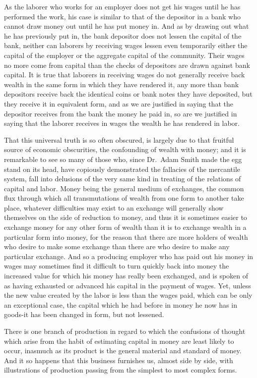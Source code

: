 As the laborer who works for an employer does not get his wages until he
has performed the work, his case is similar to that of the depositor in
a bank who cannot draw money out until he has put money in. And as by
drawing out what he has previously put in, the bank depositor does not
lessen the capital of the bank, neither can laborers by receiving wages
lessen even temporarily either the capital of the employer or the
aggregate capital of the community. Their wages no more come from
capital than the checks of depositors are drawn against bank capital. It
is true that laborers in receiving wages do not generally receive back
wealth in the same form in which they have rendered it, any more than
bank depositors receive back the identical coins or bank notes they have
deposited, but they receive it in equivalent form, and as we are
justified in saying that the depositor receives from the bank the money
he paid in, so are we justified in saying that the laborer receives in
wages the wealth he has rendered in labor.

That this universal truth is so often obscured, is largely due to that
fruitful source of economic obscurities, the confounding of wealth with
money; and it is remarkable to see so many of those who, since Dr.~Adam
Smith made the egg stand on its head, have copiously demonstrated the
fallacies of the mercantile system, fall into delusions of the very same
kind in treating of the relations of capital and labor. Money being the
general medium of exchanges, the common flux through which all
transmutations of wealth from one form to another take place, whatever
difficulties may exist to an exchange will generally show themselves on
the side of reduction to money, and thus it is sometimes easier to
exchange money for any other form of wealth than it is to exchange
wealth in a particular form into money, for the reason that there are
more holders of wealth who desire to make some exchange than there are
who desire to make any particular exchange. And so a producing employer
who has paid out his money in wages may sometimes find it difficult to
turn quickly back into money the increased value for which his money has
really been exchanged, and is spoken of as having exhausted or advanced
his capital in the payment of wages. Yet, unless the new value created
by the labor is less than the wages paid, which can be only an
exceptional case, the capital which he had before in money he now has in
goods-it has been changed in form, but not lessened.

There is one branch of production in regard to which the confusions of
thought which arise from the habit of estimating capital in money are
least likely to occur, inasmuch as its product is the general material
and standard of money. And it so happens that this business furnishes
us, almost side by side, with illustrations of production passing from
the simplest to most complex forms.

